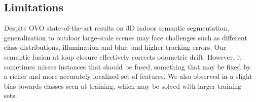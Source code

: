 \subsection{{Limitations}}\label{sec:limitations}
{Despite OVO state-of-the-art results on 3D indoor semantic segmentation, generalization to outdoor large-scale scenes may face challenges such as different class distributions, illumination and blur, and higher tracking errors.
Our semantic fusion at loop closure effectively corrects odometric drift. However, it sometimes misses instances that should be fused, something that may be fixed by a richer and more accurately localized set of features.
We also observed in \clipours a slight bias towards classes seen at training, which may be solved with larger training sets.}

